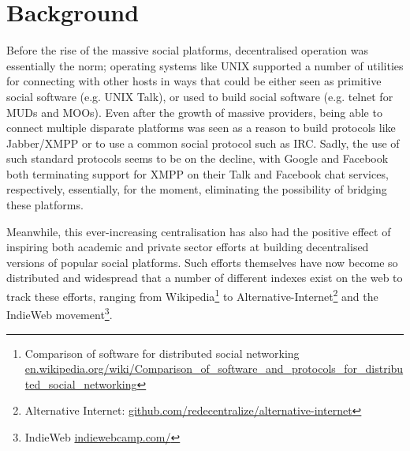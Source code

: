 \documentclass{sig-alternate}
\begin{document}

\section{Background}

Before the rise of the massive social platforms, decentralised operation was essentially the norm; operating systems like UNIX supported a number of utilities for connecting with other hosts in ways that could be either seen as primitive social software (e.g. UNIX Talk), or used to build social software (e.g. telnet for MUDs and MOOs). Even after the growth of massive providers, being able to connect multiple disparate platforms was seen as a reason to build protocols like Jabber/XMPP\cite{saint2005streaming} or to use a common social protocol such as IRC.  Sadly, the use of such standard protocols seems to be on the decline, with Google and Facebook both terminating support for XMPP on their Talk and Facebook chat services, respectively, essentially, for the moment, eliminating the possibility of bridging these platforms.

Meanwhile, this ever-increasing centralisation has also had the positive effect of inspiring both academic and private sector efforts at building decentralised versions of popular social platforms.  Such efforts themselves have now become so distributed and widespread that a number of different indexes exist on the web to track these efforts, ranging from Wikipedia\footnote{Comparison of software for distributed social networking \url{en.wikipedia.org/wiki/Comparison_of_software_and_protocols_for_distributed_social_networking}} to Alternative-Internet\footnote{Alternative Internet: \url{github.com/redecentralize/alternative-internet}} and the IndieWeb movement\footnote{IndieWeb \url{indiewebcamp.com/}}. 
\end{document}

